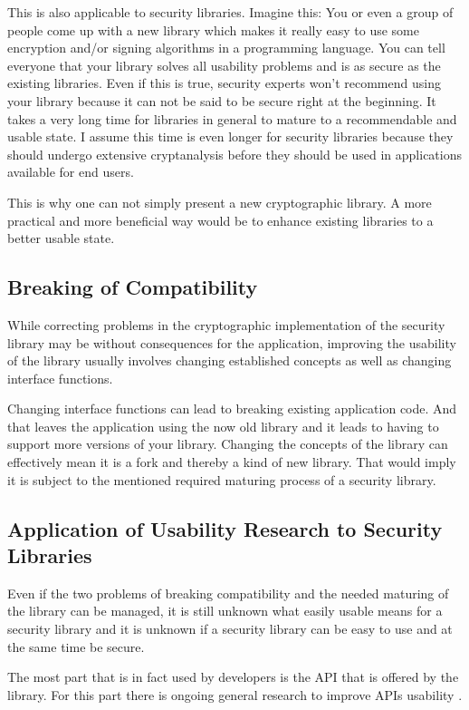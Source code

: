 \documentclass{sig-alternate-05-2015}
\begin{document}
This is also applicable to security libraries. 
Imagine this: You or even a group of people come up with a new library which makes it really easy to use some encryption and/or signing algorithms in a programming language. You can tell everyone that your library solves all usability problems and is as secure as the existing libraries. Even if this is true, security experts won't recommend using your library because it can not be said to be secure right at the beginning. It takes a very long time for libraries in general to mature to a recommendable and usable state. I assume this time is even longer for security libraries because they should undergo extensive cryptanalysis before they should be used in applications available for end users.

This is why one can not simply present a new cryptographic library. A more practical and more beneficial way would be to enhance existing libraries to a better usable state.

\subsection{Breaking of Compatibility}
While correcting problems in the cryptographic implementation of the security library may be without consequences for the application, improving the usability of the library usually involves changing established concepts as well as changing interface functions.

Changing interface functions can lead to breaking existing application code. And that leaves the application using the now old library and it leads to having to support more versions of your library.
Changing the concepts of the library can effectively mean it is a fork and thereby a kind of new library. That would imply it is subject to the mentioned required maturing process of a security library.

\subsection{Application of Usability Research to Security Libraries}
Even if the two problems of breaking compatibility and the needed maturing of the library can be managed, it is still unknown what easily usable means for a security library and it is unknown if a security library can be easy to use and at the same time be secure.

The most part that is in fact used by developers is the API that is offered by the library. For this part there is ongoing general research to improve APIs usability \cite{Myers:2016:IAU:2896587}.
\end{document}
